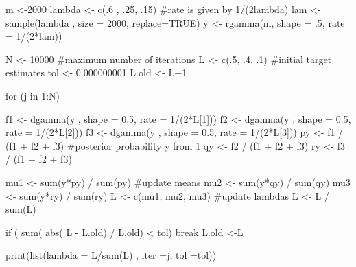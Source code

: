 
m <-2000
lambda <- c(.6 , .25, .15) #rate is given by 1/(2lambda)
lam <- sample(lambda , size = 2000, replace=TRUE)
y <- rgamma(m, shape = .5, rate = 1/(2*lam))

N <- 10000 #maximum number of iterations
L <- c(.5, .4, .1) #initial target estimates
tol <- 0.000000001
L.old <- L+1

for (j in 1:N){
    f1 <- dgamma(y , shape = 0.5, rate = 1/(2*L[1]))
    f2 <- dgamma(y , shape = 0.5, rate = 1/(2*L[2]))
    f3 <- dgamma(y , shape = 0.5, rate = 1/(2*L[3]))
    py <- f1 / (f1 + f2 + f3) #posterior probability y from 1
    qy <- f2 / (f1 + f2 + f3)
    ry <- f3 / (f1 + f2 + f3)

    mu1 <- sum(y*py) / sum(py) #update means
    mu2 <- sum(y*qy) / sum(qy)
    mu3 <- sum(y*ry) / sum(ry)
    L <- c(mu1, mu2, mu3) #update lambdas
    L <- L / sum(L)

    if ( sum( abs( L - L.old) / L.old) < tol) break
    L.old <-L
    
}

print(list(lambda = L/sum(L) , iter =j, tol =tol))

